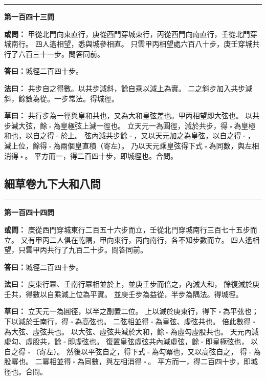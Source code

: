 \documentclass[11pt,a4paper]{article}
\let\origsquare\square
\renewcommand{\square}{\ensuremath{\origsquare}}%
\newcommand{\longline}{\noindent\rule{\textwidth}{0.4pt}}
\newcommand{\owen}[1]{%
  \par\vspace{0.4em}%
  \noindent\textcolor{problemcolor}{\textbf{或問：}}{\tradfont #1}\par\nopagebreak%
}
\newcommand{\fayue}[1]{%
  \par\noindent\textcolor{methodcolor}{\textbf{法曰：}}{\tradfont #1}\par\nopagebreak%
}
\newcommand{\tsaoyue}[1]{%
  \par\noindent\textcolor{workcolor}{\textbf{草曰：}}{\tradfont #1}\par%
}
\newcommand{\dayue}[1]{%
  \par\noindent\textcolor{anscolor}{\textbf{答曰：}}{\tradfont #1}\par\nopagebreak%
}
\newcommand{\wen}[1]{\par\vspace{0.3em}\noindent\textcolor{problemcolor}{\textbf{第#1問}}\par}
\begin{document}
\vspace{0.5cm}
\begin{center}
\longline
\end{center}

\wen{一百四十三}
\owen{%
甲從北門向東直行，庚從西門穿城東行，丙從西門向南直行，壬從北門穿城南行。
四人遙相望，悉與城參相直。
只雲甲丙相望處六百八十步，庚壬穿城共行了六百三十一步。問答同前。}
\dayue{城徑二百四十步。}

\fayue{%
共步自之得數。以共步減斜，餘自乘以減上為實。
二之斜步加入共步減斜，餘數為從。一步常法。得城徑。}

\tsaoyue{%
共行步為一徑與皇和共也，又為大和皇弦差也。甲丙相望即大弦也。
以共步減大弦，餘$ \; \square \; $為皇極弦上減一徑也。
立天元一為圓徑，減於共步，得$ \; \square \; $為皇極和也，以自之得$ \; \square \; $於上。
弦內減共步餘$ \; \square \; $，又以天元加之為皇弦，以自之得$ \; \square \; $，
減上位，餘得$ \; \square \; $為兩個皇直積（寄左）。
乃以天元乘皇弦得下式$ \; \square \; $為同數，與左相消得$ \; \square \; $。
平方而一，得二百四十步，即城徑也。合問。}

\newpage
\subsection{\tradfont 細草卷九下\quad 大和八問}

\begin{center}
\longline
\end{center}

\wen{一百四十四}
\owen{%
庚從西門穿城東行二百五十六步而立，壬從北門穿城南行三百七十五步而立。
又有甲丙二人俱在乾隅，甲向東行，丙向南行，各不知步數而立。
四人遙相望，只雲甲丙共行了九百二十步。問答同前。}
\dayue{城徑二百四十步。}

\fayue{%
庚東行冪、壬南行冪相並於上，並庚壬步而倍之，內減大和，
餘復減於庚壬共，得數以自乘減上位為平實。
並庚壬步為益從，半步為隅法。得城徑。}

\tsaoyue{%
立天元一為圓徑，以半之副置二位。
上以減於庚東行，得下$ \; \square \; $為平弦也；下以減於壬南行，得$ \; \square \; $為高弦也。
二弦相並得$ \; \square \; $為皇弦、虛弦共也。
倍此數得$ \; \square \; $為大弦、虛弦共也。
以大弦、虛弦共減於大和，餘$ \; \square \; $為虛勾虛股共也。
天元內減虛勾、虛股共，餘$ \; \square \; $即虛弦也。
復置皇弦虛弦共內減虛弦，餘$ \; \square \; $即皇極弦也，
以自之得$ \; \square \; $（寄左）。
然後以平弦自之，得下式$ \; \square \; $為勾冪也，又以高弦自之，
得$ \; \square \; $為股冪也。
二冪相並得$ \; \square \; $為同數，與左相消得$ \; \square \; $。
平方而一，得二百四十步，即城徑也。合問。}
\end{document}
